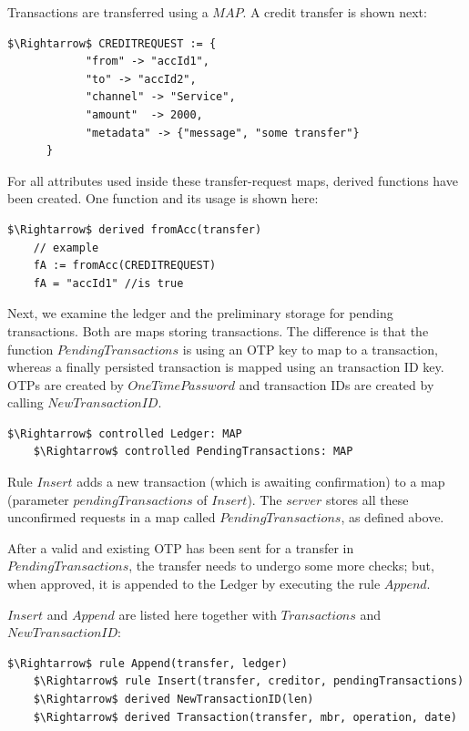 Transactions are transferred using a $MAP$. A credit transfer is shown next:
\begin{lstlisting}[language=bsl,mathescape=true]
	$\Rightarrow$ CREDITREQUEST := {
			"from" -> "accId1",
			"to" -> "accId2",
			"channel" -> "Service",
			"amount"  -> 2000,
			"metadata" -> {"message", "some transfer"}
	  }	
\end{lstlisting}

For all attributes used inside these transfer-request maps, derived functions have been created. One function and its usage is shown here:
\begin{lstlisting}[language=bsl,mathescape=true]
	$\Rightarrow$ derived fromAcc(transfer)
	// example
	fA := fromAcc(CREDITREQUEST)
	fA = "accId1" //is true
\end{lstlisting}

Next, we examine the ledger and the preliminary storage for pending transactions. Both are maps storing transactions. The difference is that the function $PendingTransactions$ is using an OTP key to map to a transaction, whereas a finally persisted transaction is mapped using an transaction ID key. OTPs are created by $OneTimePassword$ and transaction IDs are created by calling $NewTransactionID$.

\begin{lstlisting}[language=bsl,mathescape=true]
	$\Rightarrow$ controlled Ledger: MAP
	$\Rightarrow$ controlled PendingTransactions: MAP
\end{lstlisting}

Rule $Insert$ adds a new transaction (which is awaiting confirmation) to a map (parameter $pendingTransactions$ of $Insert$). The $server$ stores all these unconfirmed requests in a map called $PendingTransactions$, as defined above.

After a valid and existing OTP has been sent for a transfer in $PendingTransactions$, the transfer needs to undergo some more checks; but, when approved, it is appended to the Ledger by executing the rule $Append$.

$Insert$ and $Append$ are listed here together with $Transactions$ and $NewTransactionID$:

\begin{lstlisting}[language=bsl,mathescape=true]
	$\Rightarrow$ rule Append(transfer, ledger)
	$\Rightarrow$ rule Insert(transfer, creditor, pendingTransactions)
	$\Rightarrow$ derived NewTransactionID(len)
	$\Rightarrow$ derived Transaction(transfer, mbr, operation, date)
\end{lstlisting}

